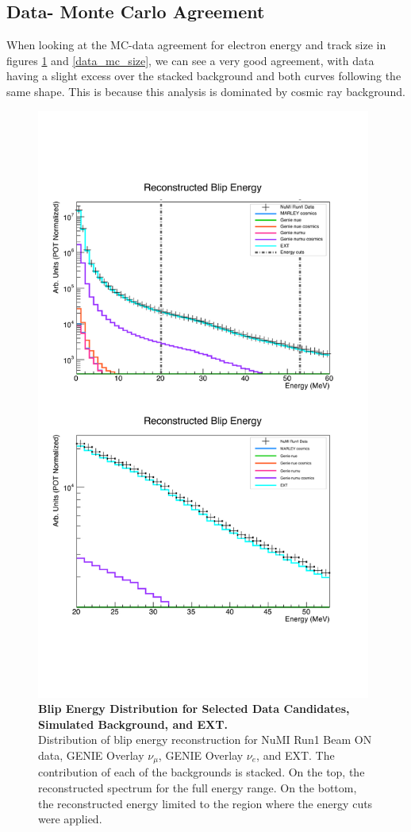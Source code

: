 \clearpage
\subsection{Data- Monte Carlo Agreement}
When looking at the MC-data agreement for electron energy and track size in figures \ref{data_mc_energy} and \ref{data_mc_size}, we can see a very good agreement, with data having a slight excess over the stacked background and both curves following the same shape. This is because this analysis is dominated by cosmic ray background.


\begin{figure}[h!]
    \centering
    \includegraphics[width=110mm]{Figures/energy_double.pdf}
    \caption[Blip Energy Distribution for Selected Data Candidates, Simulated Background, and EXT.]{{\textbf{Blip Energy Distribution for Selected Data Candidates, Simulated Background, and EXT.}}\\ Distribution of blip energy reconstruction for NuMI Run1 Beam ON data, GENIE Overlay $\nu_{\mu}$, GENIE Overlay $\nu_{e}$, and EXT. The contribution of each of the backgrounds is stacked. On the top, the reconstructed spectrum for the full energy range. On the bottom, the reconstructed energy limited to the region where the energy cuts were applied.}
    \label{data_mc_energy}
\end{figure}

